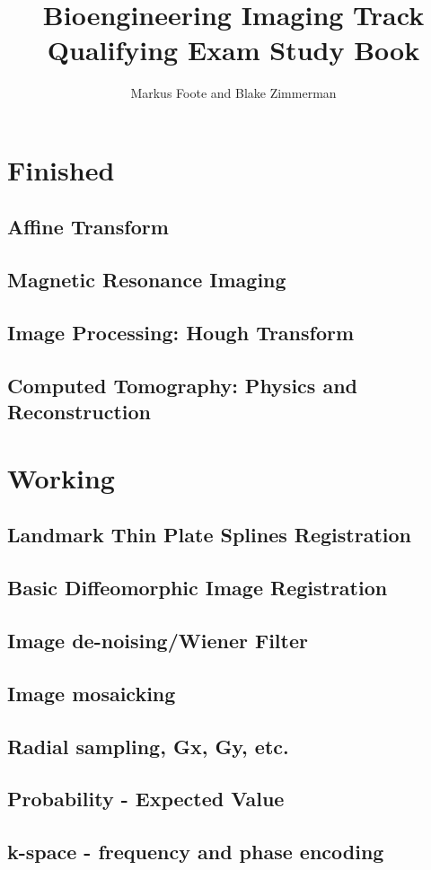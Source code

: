 \documentclass{report}
\title{Bioengineering Imaging Track Qualifying Exam Study Book}
\author{Markus Foote and Blake Zimmerman}
\begin{document}
	\maketitle
	\setcounter{tocdepth}{1} %
	\tableofcontents
	\part{Finished}
	\chapter{Affine Transform}
	
	
	\chapter{Magnetic Resonance Imaging}
	
	
	\chapter{Image Processing: Hough Transform}
	
	
	\chapter{Computed Tomography: Physics and Reconstruction}
	
	\part{Working}
	\chapter{Landmark Thin Plate Splines Registration}
	
	\chapter{Basic Diffeomorphic Image Registration}
	
	\chapter{Image de-noising/Wiener Filter}
	
	\chapter{Image mosaicking}
	
	\chapter{Radial sampling, Gx, Gy, etc.}
	
	\chapter{Probability - Expected Value}
	
	\chapter{k-space - frequency and phase encoding}
	
	
	
	
	
	
		
\end{document}
